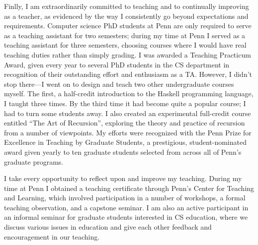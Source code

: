 \documentclass{article}
\begin{document}
Finlly, I am extraordinarily committed to teaching and to continually
improving as a teacher, as evidenced by the way I consistently go
beyond expectations and requirements.  Computer science PhD students
at Penn are only required to serve as a teaching assistant for two
semesters; during my time at Penn I served as a teaching assistant for
three semesters, choosing courses where I would have real teaching
duties rather than simply grading.  I was awarded a Teaching Practicum
Award, given every year to several PhD students in the CS department
in recognition of their outstanding effort and enthusiasm as a TA.
However, I didn't stop there---I went on to design and teach two other
undergraduate courses myself. The first, a half-credit introduction to
the Haskell programming language, I taught three times.  By the third
time it had become quite a popular course; I had to turn some students
away.  I also created an experimental full-credit course entitled
``The Art of Recursion'', exploring the theory and practice of
recursion from a number of viewpoints.  My efforts were recognized
with the Penn Prize for Excellence in Teaching by Graduate Students, a
prestigious, student-nominated award given yearly to ten graduate
students selected from across all of Penn's graduate programs.

I take every opportunity to reflect upon and improve my
teaching. During my time at Penn I obtained a teaching certificate
through Penn's Center for Teaching and Learning, which involved
participation in a number of workshops, a formal teaching observation,
and a capstone seminar.  I am also an active participant in an
informal seminar for graduate students interested in CS education,
where we discuss various issues in education and give each other
feedback and encouragement in our teaching.
\end{document}
